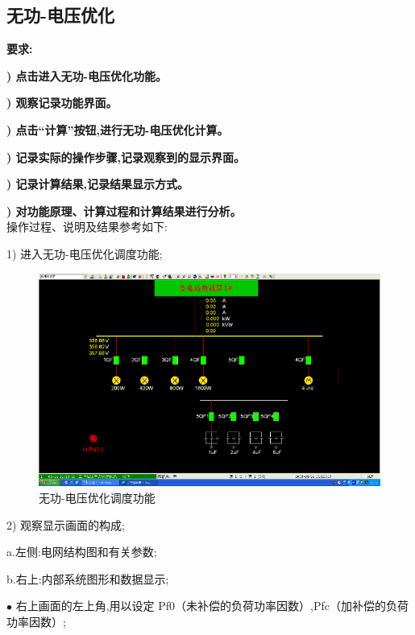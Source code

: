 \documentclass[a4paper]{ctexrep}
\begin{document}
                \subsection{无功-电压优化}
                    \textbf{要求:}

                    \textbf{) 点击进入无功-电压优化功能。}

                    \textbf{) 观察记录功能界面。}

                    \textbf{) 点击“计算”按钮,进行无功-电压优化计算。}

                    \textbf{) 记录实际的操作步骤,记录观察到的显示界面。}

                    \textbf{) 记录计算结果,记录结果显示方式。}

                    \textbf{) 对功能原理、计算过程和计算结果进行分析。} \\

                    操作过程、说明及结果参考如下:

                    1) 进入无功-电压优化调度功能;

                    \begin{figure}[htbp]
                        \centering
                        \includegraphics[width=12cm]{11.png} 
                        \caption{无功-电压优化调度功能}
                    \end{figure}

                    2) 观察显示画面的构成;

                    \quad a.左侧:电网结构图和有关参数;

                    \quad b.右上:内部系统图形和数据显示;
                    
                    \qquad $\bullet$ \quad 右上画面的左上角,用以设定 Pf0（未补偿的负荷功率因数）,Pfc（加补偿的负荷功率因数）;
                    
\end{document}
